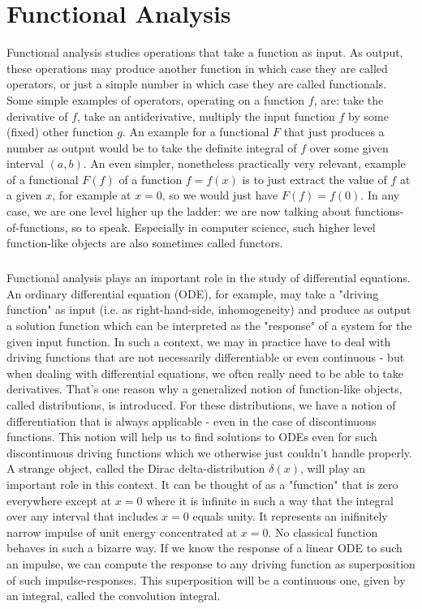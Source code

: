 \chapter{Functional Analysis}
Functional analysis studies operations that take a function as input. As output, these operations may produce another function in which case they are called operators, or just a simple number in which case they are called functionals. Some simple examples of operators, operating on a function $f$, are: take the derivative of $f$, take an antiderivative, multiply the input function $f$ by some (fixed) other function $g$. An example for a functional $F$ that just produces a number as output would be to take the definite integral of $f$ over some given interval $(a,b)$. An even simpler, nonetheless practically very relevant, example of a functional $F(f)$ of a function $f = f(x)$ is to just extract the value of $f$ at a given $x$, for example at $x=0$, so we would just have $F(f) = f(0)$. In any case, we are one level higher up the ladder: we are now talking about functions-of-functions, so to speak. Especially in computer science, such higher level function-like objects are also sometimes called functors. 

\paragraph{}
Functional analysis plays an important role in the study of differential equations. An ordinary differential equation (ODE), for example, may take a "driving function" as input (i.e. as right-hand-side, inhomogeneity) and produce as output a solution function which can be interpreted as the "response" of a system for the given input function. In such a context, we may in practice have to deal with driving functions that are not necessarily differentiable or even continuous - but when dealing with differential equations, we often really need to be able to take derivatives. That's one reason why a generalized notion of function-like objects, called distributions, is introduced. For these distributions, we have a notion of differentiation that is always applicable - even in the case of discontinuous functions. This notion will help us to find solutions to ODEs even for such discontinuous driving functions which we otherwise just couldn't handle properly. A strange object, called the Dirac delta-distribution $\delta(x)$, will play an important role in this context. It can be thought of as a "function" that is zero everywhere except at $x=0$ where it is infinite in such a way that the integral over any interval that includes $x=0$ equals unity. It represents an inifinitely narrow impulse of unit energy concentrated at $x=0$. No classical function behaves in such a bizarre way. If we know the response of a linear ODE to such an impulse, we can compute the response to any driving function as superposition of such impulse-responses. This superposition will be a continuous one, given by an integral, called the convolution integral.

